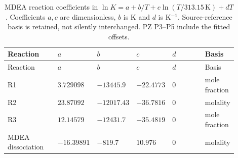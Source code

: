 \begingroup\small\setlength{\tabcolsep}{3pt}
\begin{longtable}{@{}>{\raggedright\arraybackslash}p{0.22\linewidth}>{\raggedright\arraybackslash}p{0.13\linewidth}>{\raggedright\arraybackslash}p{0.13\linewidth}>{\raggedright\arraybackslash}p{0.13\linewidth}>{\raggedright\arraybackslash}p{0.15\linewidth}>{\raggedright\arraybackslash}p{0.14\linewidth}@{}}
\caption{MDEA reaction coefficients in $\ln K=a+b/T+c\ln(T/313.15\,\mathrm K)+dT$. Coefficients $a,c$ are dimensionless, $b$ is K and $d$ is K$^{-1}$. Source-reference basis is retained, not silently interchanged. PZ P3--P5 include the fitted offsets.}\label{tab:p2-mdea-laws}\\
\toprule Reaction & $a$ & $b$ & $c$ & $d$ & Basis \\ \midrule\endfirsthead
\toprule Reaction & $a$ & $b$ & $c$ & $d$ & Basis \\ \midrule\endhead
\bottomrule\endfoot
R1 & $3.729098$ & $-13445.9$ & $-22.4773$ & $0$ & mole fraction \\
R2 & $23.87092$ & $-12017.43$ & $-36.7816$ & $0$ & molality \\
R3 & $12.14579$ & $-12431.7$ & $-35.4819$ & $0$ & mole fraction \\
MDEA dissociation & $-16.39891$ & $-819.7$ & $10.976$ & $0$ & molality \\
\end{longtable}\endgroup
